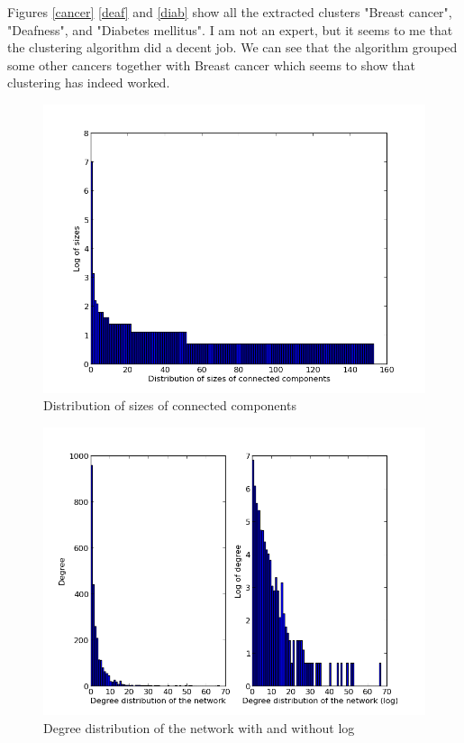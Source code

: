 \documentclass[a4paper,11pt]{article}
\begin{document}
Figures \ref{cancer} \ref{deaf} and \ref{diab} show all the extracted clusters "Breast cancer", "Deafness", and "Diabetes mellitus". I am not an expert, but it seems to me that the clustering algorithm did a decent job. We can see that the algorithm grouped some other cancers together with Breast cancer which seems to show that clustering has indeed worked.

\begin{figure}[h!]
\begin{center}
\includegraphics[scale=0.50]{components.png}
\caption{Distribution of sizes of connected components}
\label{components}
\end{center}
\end{figure}


\begin{figure}[h!]
\begin{center}
\includegraphics[scale=0.50]{scale.png}
\caption{Degree distribution of the network with and without log}
\label{scale}
\end{center}
\end{figure}
\end{document}
